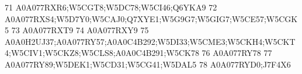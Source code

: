 \documentclass{beamer}
\begin{document}
\begin{frame}[fragile]
\begin{itemize}
\begin{Schunk}
\begin{Soutput}
71                                                                                                                                                                                                                                                                                                                                         A0A077RXR6;W5CGT8;W5DC78;W5CI46;Q6YKA9
72                                                                                                                                                                                                                                                                                                                    A0A077RXS4;W5D7Y0;W5CAJ0;Q7XYE1;W5G9G7;W5GIG7;W5CE57;W5CGK5
73                                                                                                                                                                                                                                                                                                                                                                     A0A077RXT9
74                                                                                                                                                                                                                                                                                                                                                                     A0A077RXY9
75                                                                                                                                                                                                                                                                            A0A0H2UJ37;A0A077RY57;A0A0C4B292;W5DI33;W5CME3;W5CKH4;W5CKT4;W5CIV1;W5CKZ8;W5CLS8;A0A0C4B291;W5CK78
76                                                                                                                                                                                                                                                                                                                                                                     A0A077RY78
77                                                                                                                                                                                                                                                                                                                                         A0A077RY89;W5DEK1;W5CD31;W5CG41;W5DAL5
78                                                                                                                                                                                                                                                                                                                                                              A0A077RYD0;J7F4X6

\end{Soutput}
\end{Schunk}
\end{itemize}
\end{frame}
\end{document}
